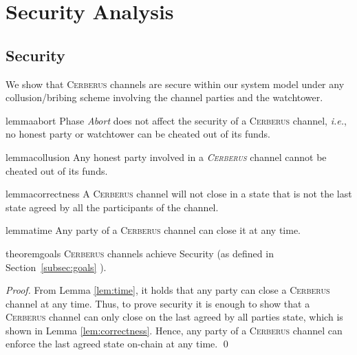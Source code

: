 \documentclass[runningheads]{llncs}
\newcommand{\ie}{{\em i.e.}}
\newcommand{\sys}{\textsc{Cerberus}\xspace}
\begin{document}
\section{Security Analysis}

\subsection{Security}

We show that \sys channels are secure within our system model under any collusion/bribing scheme involving the channel parties and the watchtower.

\vspace{-4pt}
\begin{restatable}{lemma}{abort}\label{lem:abort}
Phase \textit{Abort} does not affect the security of a \sys channel, \ie, no honest party or watchtower can be cheated out of its funds.
\end{restatable}

\vspace{-4pt}
\begin{restatable}{lemma}{collusion}\label{lem:collusion}
Any honest party involved in a \emph{\sys} channel cannot be cheated out of its funds.
\end{restatable}


\vspace{-4pt}
\begin{restatable}{lemma}{correctness}\label{lem:correctness}
A \sys channel will not close in a state that is not the last state agreed by all the participants of the channel.
\end{restatable}

\vspace{-4pt}
\begin{restatable}{lemma}{time}\label{lem:time}
Any party of a \sys channel can close it at any time.
\end{restatable}

\vspace{-4pt}
\begin{restatable}{theorem}{goals}
\sys channels achieve Security (as defined in Section~\ref{subsec:goals} ).
\end{restatable}
\begin{proof}
From Lemma \ref{lem:time}, it holds that any party can close a \sys channel at any time. Thus, to prove security it is enough to show that a \sys channel can only close on the last agreed by all parties state, which is shown in Lemma \ref{lem:correctness}. Hence, any party of a \sys channel can enforce the last agreed state on-chain at any time.
\hfill \qed
\end{proof}
\end{document}
